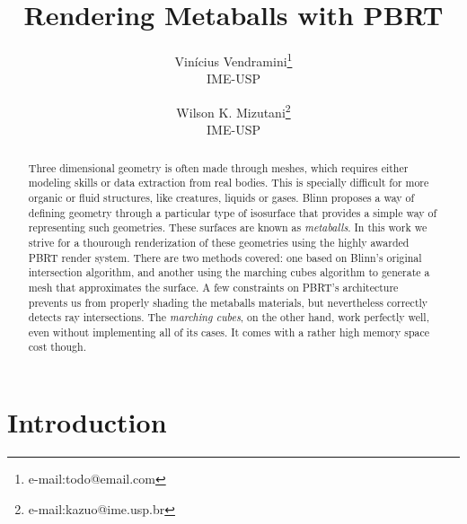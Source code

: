 \documentclass[conference]{acmsiggraph}
\title{Rendering Metaballs with PBRT}
\author{Vinícius Vendramini\thanks{e-mail:todo@email.com}\\IME-USP \and Wilson K. Mizutani\thanks{e-mail:kazuo@ime.usp.br}\\IME-USP}
\begin{document}

\maketitle

\begin{abstract}

Three dimensional geometry is often made through meshes, which requires
either modeling skills or data extraction from real bodies. This is specially
difficult for more organic or fluid structures, like creatures, liquids or
gases. Blinn  proposes a way of defining
geometry through a particular type of isosurface that provides a simple
way of representing such geometries. These surfaces are known as
\textit{metaballs}. In this work we strive for a thourough renderization of
these geometries using the highly awarded PBRT
 render system. There are two methods covered:
one based on Blinn's original intersection algorithm, and another using the
marching cubes algorithm \cite{Lorensen:1987:MCH:37402.37422} to generate a mesh
that approximates the surface. A few constraints on PBRT's architecture prevents
us from properly shading the metaballs materials, but nevertheless correctly
detects ray intersections. The \textit{marching cubes}, on the other hand, work
perfectly well, even without implementing all of its cases. It comes with a
rather high memory space cost though.

\end{abstract}


\keywordlist


\TOGlinkslist


\copyrightspace

\section{Introduction}
\end{document}
